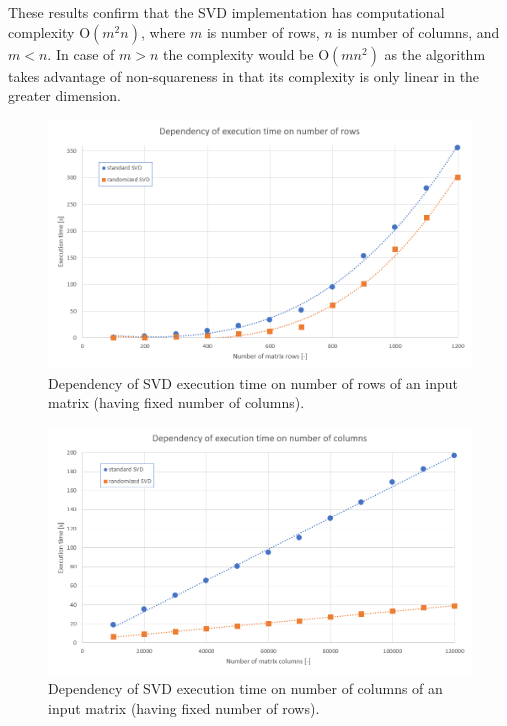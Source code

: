 These results confirm that the SVD implementation has computational complexity $\mathrm{O}(m^2n)$, where $m$ is number of rows, $n$ is number of columns, and $m < n$. In case of $m > n$ the complexity would be $\mathrm{O}(mn^2)$ as the algorithm takes advantage of non-squareness in that its complexity is only linear in the greater dimension.

\begin{figure}[H]
\centering
\includegraphics[width=\textwidth]{figures/appendix-SVD/executionTime_varyingRows}
\decoRule
\caption{Dependency of SVD execution time on number of rows of an input matrix (having fixed number of columns).}
\label{fig:ExeTime_rows}
\end{figure}

\begin{figure}[H]
\centering
\includegraphics[width=\textwidth]{figures/appendix-SVD/executionTime_varyingColumns}
\decoRule
\caption{Dependency of SVD execution time on number of columns of an input matrix (having fixed number of rows).}
\label{fig:ExeTime_columns}
\end{figure}

